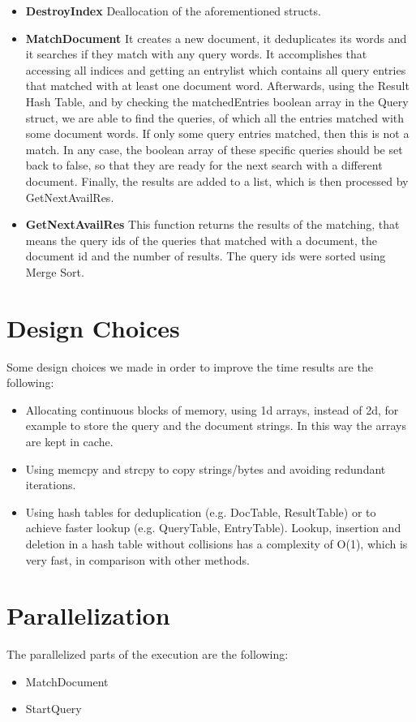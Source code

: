 \documentclass{article}
\begin{document}
\begin{itemize}
\begin{itemize}
  \item \textbf{DestroyIndex}
  Deallocation of the aforementioned structs.
  \item \textbf{MatchDocument}
  It creates a new document, it deduplicates its words and it searches if they match with any query words. It accomplishes that accessing all indices and getting an entrylist which contains all query entries that matched with at least one document word. Afterwards, using the Result Hash Table, and by checking the matchedEntries boolean array in the Query struct, we are able to find the queries, of which all the entries matched with some document words. If only some query entries matched, then this is not a match. In any case, the boolean array of these specific queries should be set back to false, so that they are ready for the next search with a different document. Finally, the results are added to a list, which is then processed by GetNextAvailRes.
  \item \textbf{GetNextAvailRes}
  This function returns the results of the matching, that means the query ids of the queries that matched with a document, the document id and the number of results. The query ids were sorted using Merge Sort.
  \end{itemize}
\end{itemize}
\section{Design Choices}
Some design choices we made in order to improve the time results are the following:
\begin{itemize}
    \item Allocating continuous blocks of memory, using 1d arrays, instead of 2d, for example to store the query and the document strings. In this way the arrays are kept in cache.
    \item Using memcpy and strcpy to copy strings/bytes and avoiding redundant iterations.
    \item Using hash tables for deduplication (e.g. DocTable, ResultTable) or to achieve faster lookup (e.g. QueryTable, EntryTable). Lookup, insertion and deletion in a hash table without collisions has a complexity of O(1), which is very fast, in comparison with other methods.
\end{itemize}
\section{Parallelization}
The parallelized parts of the execution are the following:
\begin{itemize}
\item MatchDocument
\item StartQuery
\end{itemize}
\end{document}
